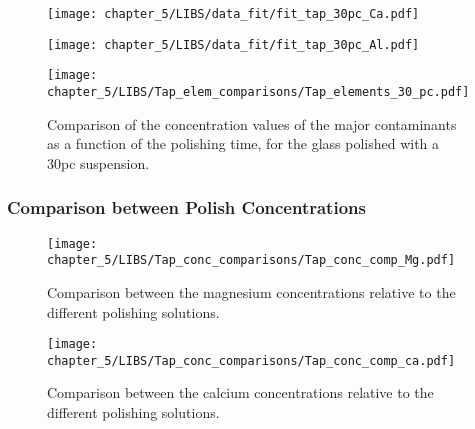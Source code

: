   \begin{figure}[H]
     \centering
     \texttt{[image: chapter\_5/LIBS/data\_fit/fit\_tap\_30pc\_Ca.pdf]} 
  \end{figure}
     \vspace{-40pt}
  \begin{figure}[H]
     \centering
     \texttt{[image: chapter\_5/LIBS/data\_fit/fit\_tap\_30pc\_Al.pdf]} 
  \end{figure}

 
  \begin{figure}[H]
     \centering
     \texttt{[image: chapter\_5/LIBS/Tap\_elem\_comparisons/Tap\_elements\_30\_pc.pdf]} 
     \vspace*{-30pt}
     \caption{Comparison of the concentration values of the major contaminants as a function of the polishing time, for the glass polished with a 30pc suspension.}
     \label{fig:tap_elem_30pc}
  \end{figure}


\subsubsection{Comparison between Polish Concentrations}
\label{subsubsec:comp_between_pol_conc}


\begin{figure}[H]
   \centering
   \texttt{[image: chapter\_5/LIBS/Tap\_conc\_comparisons/Tap\_conc\_comp\_Mg.pdf]} 
   \vspace*{-30pt}
   \caption{Comparison between the magnesium concentrations relative to the different polishing solutions.}
   \label{fig:tap_conc_comp_mg}
\end{figure}

\begin{figure}[H]
   \centering
   \texttt{[image: chapter\_5/LIBS/Tap\_conc\_comparisons/Tap\_conc\_comp\_ca.pdf]} 
   \vspace*{-30pt}
   \caption{Comparison between the calcium concentrations relative to the different polishing solutions.}
   \label{fig:tap_conc_comp_ca}
\end{figure}

